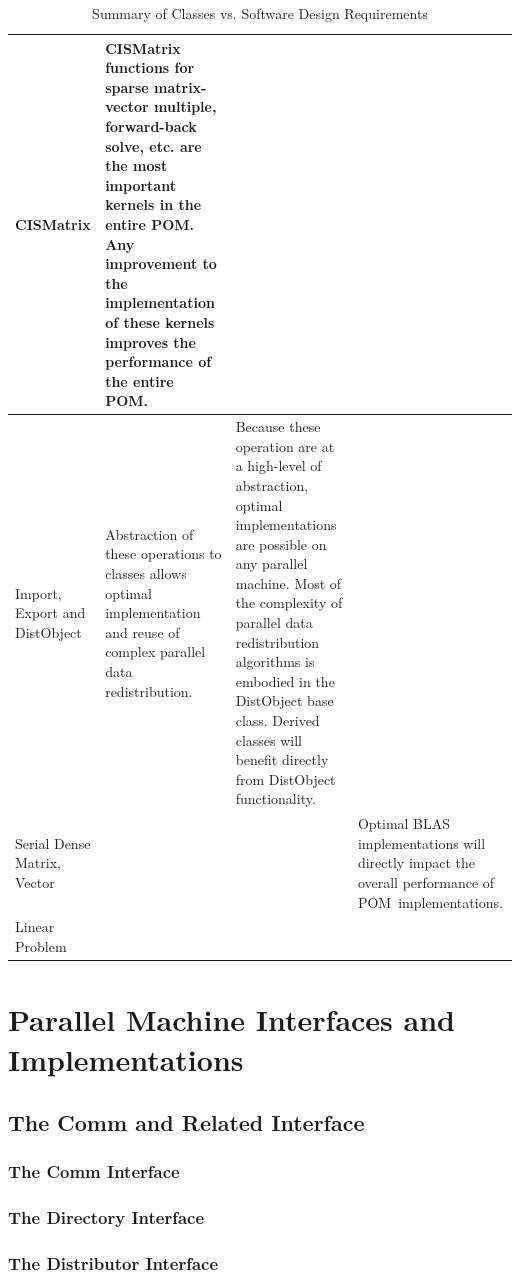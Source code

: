 \documentclass[10pt,relax]{PetraObjectModel}
\newcommand{\POM}{POM}
\begin{document}
\begin{table}
\begin{tabular}{|p{0.8in}||p{1.5in}|p{1.5in}|p{1.5in}|}
    CISMatrix & CISMatrix functions for sparse matrix-vector multiple, forward-back solve, etc. are the most important kernels
    in the entire \POM.  Any improvement to the implementation of these kernels improves the performance of the entire \POM.&
    & \\\hline
    Import, Export and DistObject & Abstraction of these operations to classes allows optimal implementation and reuse of complex
    parallel data redistribution. &
    Because these operation are at a high-level of abstraction, optimal implementations are possible on any parallel machine.
    Most of the complexity of parallel data redistribution algorithms is embodied in the DistObject base class.  Derived
    classes will benefit directly from DistObject functionality. & \\\hline
    Serial Dense Matrix, Vector &  &
    & Optimal BLAS implementations will directly impact the overall performance of \POM\ implementations.\\\hline
    Linear Problem & & & \\\hline

  \end{tabular}
  \caption{Summary of Classes vs. Software Design Requirements}\label{Table:ClassesVsSWRequirements}
\end{table}



\section{Parallel Machine Interfaces and
Implementations}

\subsection{The Comm and Related Interface}

\subsubsection{The Comm Interface}
\subsubsection{The Directory Interface}
\subsubsection{The Distributor Interface}
\end{document}
